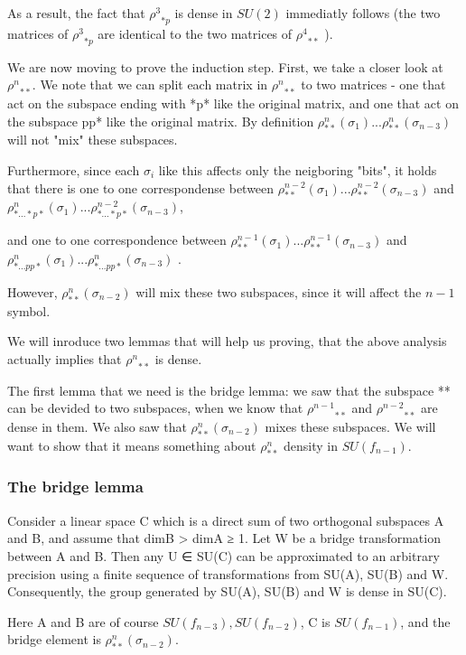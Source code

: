\documentclass{article}
\begin{document}
As a result, the fact that ${\rho^{3}}_{*p}$ is dense in  $SU(2)$ immediatly follows (the two matrices of ${\rho^{3}}_{*p}$  are identical to the two matrices of ${\rho^{4}}_{**}$ ).

We are now moving to prove the induction step. First, we take a closer look at  ${\rho^{n}}_{**}$. We note that we can split each matrix in ${\rho^{n}}_{**}$ to two matrices - one that act on the subspace ending with *p* like the original matrix, and one that act on the subspace pp* like the original matrix. By definition $\rho^{n}_{**}(\sigma_{1}) ... \rho^{n}_{**}(\sigma_{n-3})$ will not "mix" these subspaces.

Furthermore, since each $\sigma_{i}$ like this affects only the neigboring "bits", it holds that there is one to one correspondense between $\rho^{n-2}_{**}(\sigma_{1}) ... \rho^{n-2}_{**}(\sigma_{n-3})$ and $\rho^{n}_{*...*p*}(\sigma_{1}) ... \rho^{n-2}_{*...*p*}(\sigma_{n-3})$, 

and one to one correspondence between $\rho^{n-1}_{**}(\sigma_{1}) ... \rho^{n-1}_{**}(\sigma_{n-3})$ and $\rho^{n}_{*...pp*}(\sigma_{1}) ... \rho^{n}_{*...pp*}(\sigma_{n-3})$ .

However, $\rho^{n}_{**}(\sigma_{n-2})$ will mix these two subspaces, since it will affect the $n-1$ symbol.

We will inroduce two lemmas that will help us proving, that the above analysis actually implies that ${\rho^{n}}_{**}$ is dense.

The first lemma that we need is the bridge lemma: we saw that the subspace ** can be devided to two subspaces, when we know that  ${\rho^{n-1}}_{**}$ and ${\rho^{n-2}}_{**}$ are dense in them. We also saw that $\rho^{n}_{**}(\sigma_{n-2})$ mixes these subspaces. We will want to show that it means something about $\rho^{n}_{**}$ density in $SU(f_{n-1})$. 

\subsubsection{The bridge lemma}
Consider a linear space C which is a direct sum of two orthogonal subspaces A and B, and assume that dimB > dimA ≥ 1.
Let W be a bridge transformation between A and B. Then any U ∈ SU(C) can be
approximated to an arbitrary precision using a finite sequence of transformations from
SU(A), SU(B) and W. Consequently, the group generated by SU(A), SU(B) and W
is dense in SU(C).

Here A and B are of course $SU(f_{n-3}), SU(f_{n-2})$, C is $SU(f_{n-1})$, and the bridge element is  $\rho^{n}_{**}(\sigma_{n-2})$.
\end{document}
